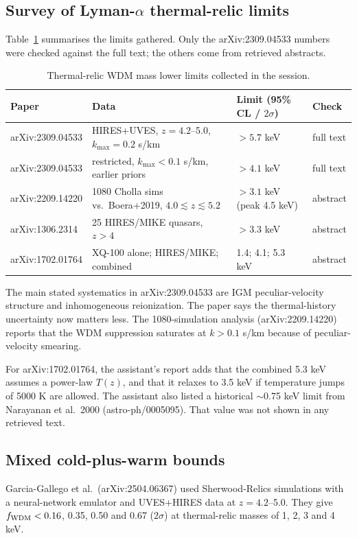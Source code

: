 \documentclass[11pt,a4paper]{article}
\begin{document}
\subsection{Survey of Lyman-$\alpha$ thermal-relic limits}
Table~\ref{tab:lya} summarises the limits gathered. Only the arXiv:2309.04533 numbers were checked against the full text; the others come from retrieved abstracts.

\begin{table}[h]
\centering
\begin{tabular}{llll}
\toprule
Paper & Data & Limit (95\% CL / $2\sigma$) & Check \\
\midrule
arXiv:2309.04533 & HIRES+UVES, $z=4.2$--5.0, $k_{\max}=0.2$ s/km & $>5.7$ keV & full text \\
arXiv:2309.04533 & restricted, $k_{\max}<0.1$ s/km, earlier priors & $>4.1$ keV & full text \\
arXiv:2209.14220 & 1080 Cholla sims vs.\ Boera+2019, $4.0\lesssim z\lesssim5.2$ & $>3.1$ keV (peak 4.5 keV) & abstract \\
arXiv:1306.2314 & 25 HIRES/MIKE quasars, $z>4$ & $>3.3$ keV & abstract \\
arXiv:1702.01764 & XQ-100 alone; HIRES/MIKE; combined & 1.4; 4.1; 5.3 keV & abstract \\
\bottomrule
\end{tabular}
\caption{Thermal-relic WDM mass lower limits collected in the session.}
\label{tab:lya}
\end{table}

The main stated systematics in arXiv:2309.04533 are IGM peculiar-velocity structure and inhomogeneous reionization. The paper says the thermal-history uncertainty now matters less. The 1080-simulation analysis (arXiv:2209.14220) reports that the WDM suppression saturates at $k>0.1$ s/km because of peculiar-velocity smearing.

For arXiv:1702.01764, the assistant's report adds that the combined 5.3 keV assumes a power-law $T(z)$, and that it relaxes to 3.5 keV if temperature jumps of 5000 K are allowed. The assistant also listed a historical $\sim$0.75 keV limit from Narayanan et al.\ 2000 (astro-ph/0005095). That value was not shown in any retrieved text.

\subsection{Mixed cold-plus-warm bounds}
Garcia-Gallego et al.\ (arXiv:2504.06367) used Sherwood-Relics simulations with a neural-network emulator and UVES+HIRES data at $z=4.2$--5.0. They give $f_{\rm WDM}<0.16$, 0.35, 0.50 and 0.67 ($2\sigma$) at thermal-relic masses of 1, 2, 3 and 4 keV.
\end{document}
